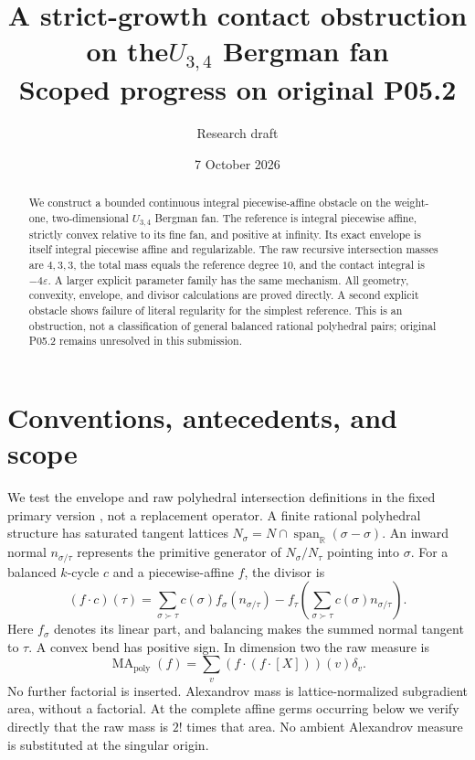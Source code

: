 \documentclass[11pt]{article}
\title{A strict-growth contact obstruction on the\texorpdfstring{$U_{3,4}$}{U3,4} Bergman fan\\\large Scoped progress on original P05.2}
\author{Research draft}
\date{7 October 2026}
\newcommand{\R}{\mathbb R}
\newcommand{\MA}{\operatorname{MA}_{\mathrm{poly}}}
\newcommand{\eps}{\varepsilon}
\begin{document}
\maketitle
\begin{abstract}
We construct a bounded continuous integral piecewise-affine obstacle on the weight-one, two-dimensional $U_{3,4}$ Bergman fan. The reference is integral piecewise affine, strictly convex relative to its fine fan, and positive at infinity. Its exact envelope is itself integral piecewise affine and regularizable. The raw recursive intersection masses are $4,3,3$, the total mass equals the reference degree $10$, and the contact integral is $-4\eps$. A larger explicit parameter family has the same mechanism. All geometry, convexity, envelope, and divisor calculations are proved directly. A second explicit obstacle shows failure of literal regularity for the simplest reference. This is an obstruction, not a classification of general balanced rational polyhedral pairs; original P05.2 remains unresolved in this submission.
\end{abstract}

\section{Conventions, antecedents, and scope}
We test the envelope and raw polyhedral intersection definitions in the fixed primary version \cite{BMPS}, not a replacement operator. A finite rational polyhedral structure has saturated tangent lattices $N_\sigma=N\cap\operatorname{span}_{\R}(\sigma-\sigma)$. An inward normal $n_{\sigma/\tau}$ represents the primitive generator of $N_\sigma/N_\tau$ pointing into $\sigma$. For a balanced $k$-cycle $c$ and a piecewise-affine $f$, the divisor is
\begin{equation}\label{divisor}
 (f\cdot c)(\tau)=\sum_{\sigma\succ\tau}c(\sigma)f_\sigma(n_{\sigma/\tau})
 -f_\tau\left(\sum_{\sigma\succ\tau}c(\sigma)n_{\sigma/\tau}\right).
\end{equation}
Here $f_\sigma$ denotes its linear part, and balancing makes the summed normal tangent to $\tau$. A convex bend has positive sign. In dimension two the raw measure is
\[\MA(f)=\sum_v(f\cdot(f\cdot[X]))(v)\delta_v.\]
No further factorial is inserted. Alexandrov mass is lattice-normalized subgradient area, without a factorial. At the complete affine germs occurring below we verify directly that the raw mass is $2!$ times that area. No ambient Alexandrov measure is substituted at the singular origin.
\end{document}
